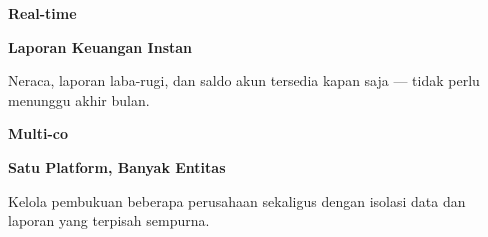\documentclass[a4paper]{article}
\begin{document}
\begin{minipage}[t]{0.485\textwidth}
    \noindent\colorbox{BlueBg}{%
        \begin{minipage}[t]{\dimexpr\linewidth-2\fboxsep}
            \vspace{6pt}
            {\fontsize{20}{24}\selectfont\bfseries\color{BluePrimary} Real-time}\par\vspace{2pt}
            {\fontsize{9.5}{12}\selectfont\bfseries\color{BlueDark} Laporan Keuangan Instan}\par\vspace{2pt}
            {\fontsize{8.5}{11}\selectfont\color{TextDark}Neraca, laporan laba-rugi, dan saldo akun tersedia kapan saja — tidak perlu menunggu akhir bulan.}%
            \vspace{6pt}
        \end{minipage}}%
    \vspace{6pt}
    \noindent\colorbox{BlueBg}{%
        \begin{minipage}[t]{\dimexpr\linewidth-2\fboxsep}
            \vspace{6pt}
            {\fontsize{20}{24}\selectfont\bfseries\color{BluePrimary} Multi-co}\par\vspace{2pt}
            {\fontsize{9.5}{12}\selectfont\bfseries\color{BlueDark} Satu Platform, Banyak Entitas}\par\vspace{2pt}
            {\fontsize{8.5}{11}\selectfont\color{TextDark}Kelola pembukuan beberapa perusahaan sekaligus dengan isolasi data dan laporan yang terpisah sempurna.}%
            \vspace{6pt}
        \end{minipage}}%
\end{minipage}

\vspace{8pt}
\end{document}
